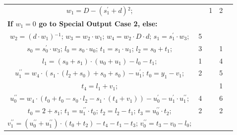 \begin{tabular}{|c|cr|c|c|c|c|}
\multicolumn{3}{|R{340pt}|}{ 
$w_1=D-(s^{\prime}_1+d){}^{2}$;\hspace{4pt}
} &  & 1 & 2 & \\
\multicolumn{3}{|l|}{ 
 \bf{If $w_1 = 0$ go to Special Output Case 2, else:} } &  &  &  & \\
\multicolumn{3}{|R{340pt}|}{ 
$w_2=(d \cdot w_1){}^{-1}$;\hspace{4pt}
$w_3=w_2 \cdot w_1$;\hspace{4pt}
$w_4=w_2 \cdot D \cdot d$;\hspace{4pt}
$s_1=s^{\prime}_1 \cdot w_3$;\hspace{4pt}
} & 5 &  &  & \\
\multicolumn{3}{|R{340pt}|}{ 
$s_0=s^{\prime}_0 \cdot w_3$;\hspace{4pt}
$l_0=s_0 \cdot u_0$;\hspace{4pt}
$t_1=s_1 \cdot u_1$;\hspace{4pt}
$l_2=s_0+t_1$;\hspace{4pt}
} & 3 &  & 1 & \\
\multicolumn{3}{|R{340pt}|}{ 
$l_1=(s_0+s_1) \cdot (u_0+u_1)-l_0-t_1$;\hspace{4pt}
} & 1 &  & 4 & \\
\multicolumn{3}{|R{340pt}|}{ 
$u^{\prime\prime}_1=w_4 \cdot (s_1 \cdot (l_2+s_0)+s_0+s_0)-u^{\prime}_1$;\hspace{4pt}
$t_0=y_1-v_1$;\hspace{4pt}
} & 2 &  & 5 & \\
\multicolumn{3}{|R{340pt}|}{ 
$t_4=l_1+v_1$;\hspace{4pt}
} &  &  & 1 & \\
\multicolumn{3}{|R{340pt}|}{ 
$u^{\prime\prime}_0=w_4 \cdot (t_0+t_0-s_0 \cdot l_2-s_1 \cdot (t_4+v_1))-u^{\prime}_0-u^{\prime}_1 \cdot u^{\prime\prime}_1$;\hspace{4pt}
} & 4 &  & 6 & \\
\multicolumn{3}{|R{340pt}|}{ 
$t_0=2+s_1$;\hspace{4pt}
$t_1=u^{\prime\prime}_1 \cdot t_0$;\hspace{4pt}
$t_2=l_2-t_1$;\hspace{4pt}
$t_3=u^{\prime\prime}_0 \cdot t_2$;\hspace{4pt}
} & 2 &  & 2 & \\
\multicolumn{3}{|R{340pt}|}{ 
$v^{\prime\prime}_1=(u^{\prime\prime}_0+u^{\prime\prime}_1) \cdot (t_0+t_2)-t_4-t_1-t_3$;\hspace{4pt}
$v^{\prime\prime}_0=t_3-v_0-l_0$;\hspace{4pt}
}
\end{tabular}
